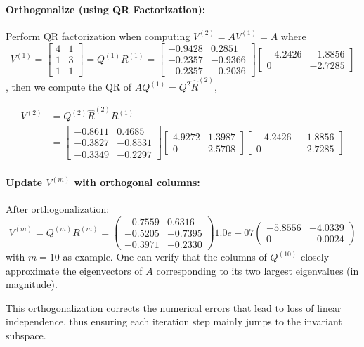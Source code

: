 \paragraph{Orthogonalize (using QR Factorization):}

Perform QR factorization when computing $V^{(2)}= AV^{(1)} = A$ where
$$
V^{(1)} = \begin{bmatrix} 4 & 1 \\ 1 & 3 \\ 1 & 1 \end{bmatrix} =Q^{(1)}R^{(1)}=  \begin{bmatrix}
-0.9428 & 0.2851 \\
-0.2357 & -0.9366 \\
-0.2357 & -0.2036
\end{bmatrix} \begin{bmatrix}
-4.2426 & -1.8856 \\
0 & -2.7285
\end{bmatrix}
$$,
then we compute the QR of $AQ^{(1)} = Q^{2} \hat{R}^{(2)}$,

$$
\begin{aligned}
    V^{(2)}& =Q^{(2)} \hat{R}^{(2)}R^{(1)}\\
            & = \begin{bmatrix}
-0.8611 & 0.4685 \\
-0.3827 & -0.8531 \\
-0.3349 & -0.2297
\end{bmatrix} \begin{bmatrix}
4.9272 & 1.3987 \\
0 & 2.5708
\end{bmatrix}\begin{bmatrix}
-4.2426 & -1.8856 \\
0 & -2.7285
\end{bmatrix}
\end{aligned}
$$

\paragraph{Update $V^{(m)}$ with orthogonal columns:} 

After orthogonalization:
$$
V^{(m)}=Q^{(m)} R^{(m)} =\begin{pmatrix}
-0.7559 & 0.6316 \\
-0.5205 & -0.7395 \\
-0.3971 & -0.2330
\end{pmatrix} 1.0e+07 \begin{pmatrix}
-5.8556 & -4.0339 \\
0 & -0.0024
\end{pmatrix}
$$
with $m = 10$ as example. One can verify that the columns of $Q^{(10)}$ closely approximate the eigenvectors of $A$ corresponding to its two largest eigenvalues (in magnitude).

This orthogonalization corrects the numerical errors that lead to loss of linear independence, thus ensuring each iteration step mainly jumps to the invariant subspace.


